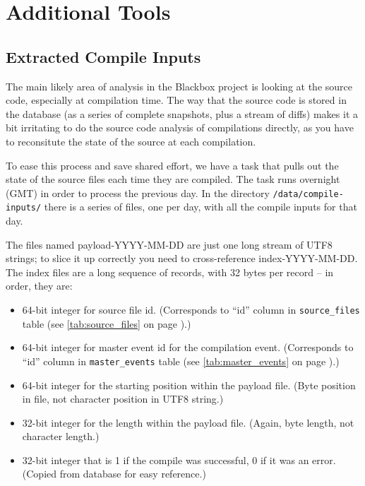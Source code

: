 \documentclass{report}
\newcommand{\myref}[1]{\autoref{#1} on page \pageref*{#1}}
\newcommand{\tabref}[1]{\lstinline|#1| table (see \myref{tab:#1})}
\begin{document}
\chapter{Additional Tools}
\label{sec:postprocess}


\section{Extracted Compile Inputs}

The main likely area of analysis in the Blackbox project is looking at
the source code, especially at compilation time.  The way that the
source code is stored in the database (as a series of complete
snapshots, plus a stream of diffs) makes it a bit irritating to do the
source code analysis of compilations directly, as you have to
reconsitute the state of the source at each compilation.

To ease this process and save shared effort, we have a task that pulls
out the state of the source files each time they are compiled.  The
task runs overnight (GMT) in order to process the previous day.  In
the directory \texttt{/data/compile-inputs/} there is a series of files, one
per day, with all the compile inputs for that day.

The files named payload-YYYY-MM-DD are just one long stream of UTF8 strings;
to slice it up correctly you need to cross-reference
index-YYYY-MM-DD.  The index files are a long sequence of records,
with 32 bytes per record -- in order, they are:

\begin{itemize}
\item 64-bit integer for source file id.  (Corresponds to ``id'' column in
\tabref{source_files}.)
\item 64-bit integer for master event id for the compilation
event. (Corresponds to ``id'' column in \tabref{master_events}.)
\item 64-bit integer for the starting position within the payload
file. (Byte position in file, not character position in UTF8 string.)
\item 32-bit integer for the length within the payload file. (Again, byte
length, not character length.)
\item 32-bit integer that is 1 if the compile was successful, 0 if it was an
error.  (Copied from database for easy reference.)
\end{itemize}
\end{document}
